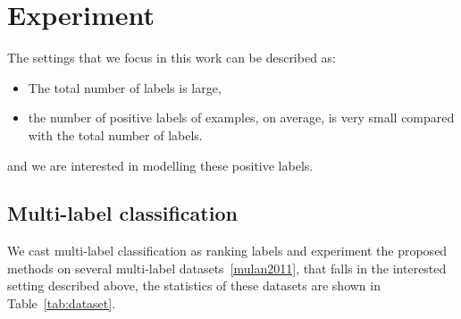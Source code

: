 \section{Experiment}
\label{sec:experiment}

The settings that we focus in this work can be described as:
\begin{itemize}
\item The total number of labels is large,
\item the number of positive labels of examples, on average, is very small compared with the total number of labels.
\end{itemize}
and we are interested in modelling these positive labels.

\subsection{Multi-label classification}

We cast multi-label classification as ranking labels and experiment the proposed methods on several multi-label datasets~\ref{mulan2011}, 
that falls in the interested setting described above, the statistics of these datasets are shown in Table~\ref{tab:dataset}.


